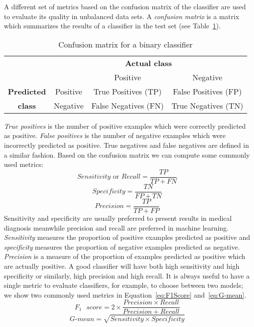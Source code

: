 A different set of metrics based on the confusion matrix of the classifier are used to evaluate its quality in unbalanced data sets. A \emph{confusion matrix} is a matrix which summarizes the results of a classifier in the test set (see Table~\ref{tab:ConfusionMatrix}).
\begin{table}[h]
	\centering
	\begin{tabular}{cc|c|c|}
		&\multicolumn{3}{c}{\textbf{Actual class}}\\
		&&Positive & Negative \\
		\cline{2-4}
		\textbf{Predicted}&Positive&True Positives (TP)& False Positives (FP)\\
		\cline{2-4}
		\textbf{class}&Negative&False Negatives (FN) & True Negatives (TN)\\
		\cline{2-4}
	\end{tabular}
	\caption{Confusion matrix for a binary classifier}
	\label{tab:ConfusionMatrix}
\end{table}
\emph{True positives} is the number of positive examples which were correctly predicted as positive. \emph{False positives} is the number of negative examples which were incorrectly predicted as positive. True negatives and false negatives are defined in a similar fashion. Based on the confusion matrix we can compute some commonly used metrics:
\begin{equation}
	Sensitivity \text{ or } Recall = \frac{TP}{TP+FN}
\end{equation}
\begin{equation}
	Specificity = \frac{TN}{FP+TN}
\end{equation}
\begin{equation}
	Precision = \frac{TP}{TP+FP}
\end{equation}
Sensitivity and specificity are usually preferred to present results in medical diagnosis meanwhile precision and recall are preferred in machine learning. \emph{Sensitivity} measures the proportion of positive examples predicted as positive and \emph{specificity} measures the proportion of negative examples predicted as negative. \emph{Precision} is a measure of the proportion of examples predicted as positive which are actually positive. A good classifier will have both high sensitivity and high specificity or similarly, high precision and high recall. It is always useful to have a single metric to evaluate classifiers, for example, to choose between two models; we show two commonly used metrics in Equation~\ref{eq:F1Score} and~\ref{eq:G-mean}.
\begin{equation}
	F_1\text{ }score = 2\times\frac{Precision \times Recall}{Precision + Recall}
	\label{eq:F1Score}
\end{equation}
\begin{equation}
	G\text{-}mean = \sqrt{Sensitivity \times Specificity}
	\label{eq:G-mean}
\end{equation}

